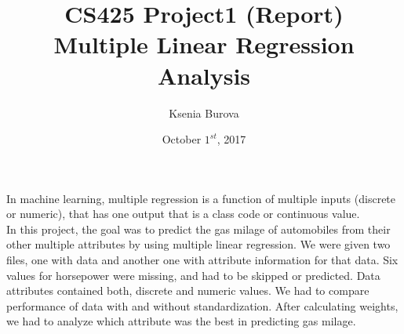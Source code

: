 \documentclass[12pt, letterpaper]{article}
\title{CS425 Project1 (Report)\\Multiple Linear Regression Analysis}
\author{Ksenia Burova}
\date{October \(1^{st}\), 2017}
\begin{document}
\maketitle

 In machine learning, multiple regression is a function of multiple inputs (discrete or numeric), that has one output that is a class code or continuous value. \\
In this project, the goal was to predict the gas milage of automobiles from their other multiple attributes by using multiple linear regression. We were given two files, one with data and another one with attribute information for that data. Six values for horsepower were missing, and had to be skipped or predicted. Data attributes contained both, discrete and numeric values. We had to compare performance of data with and without standardization. After calculating weights, we had to analyze which attribute was the best in predicting gas milage. 
\end{document}
